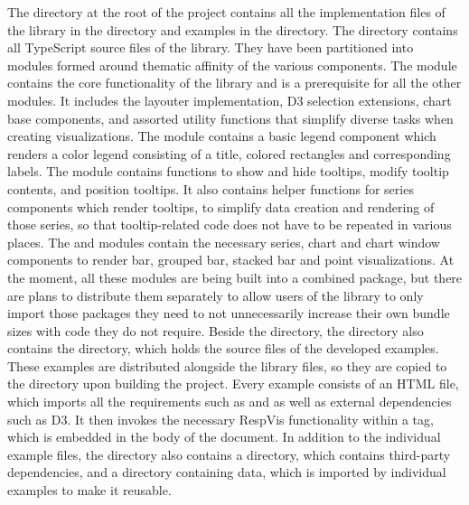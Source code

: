 The  directory at the root of the project contains all the implementation files of the library in the  directory and examples in the  directory.
The  directory contains all TypeScript source files of the library.
They have been partitioned into modules formed around thematic affinity of the various components.
The  module contains the core functionality of the library and is a prerequisite for all the other modules.
It includes the layouter implementation, D3 selection extensions, chart base components, and assorted utility functions that simplify diverse tasks when creating visualizations.
The  module contains a basic legend component which renders a color legend consisting of a title, colored rectangles and corresponding labels.
The  module contains functions to show and hide tooltips, modify tooltip contents, and position tooltips.
It also contains helper functions for series components which render tooltips, to simplify data creation and rendering of those series, so that tooltip-related code does not have to be repeated in various places.
The  and  modules contain the necessary series, chart and chart window components to render bar, grouped bar, stacked bar and point visualizations. 
At the moment, all these modules are being built into a combined package, but there are plans to distribute them separately to allow users of the library to only import those packages they need to not unnecessarily increase their own bundle sizes with code they do not require.
Beside the  directory, the  directory also contains the  directory, which holds the source files of the developed examples.
These examples are distributed alongside the library files, so they are copied to the  directory upon building the project.
Every example consists of an HTML file, which imports all the requirements such as  and  as well as external dependencies such as D3.
It then invokes the necessary RespVis functionality within a  tag, which is embedded in the body of the document.
In addition to the individual example files, the  directory also contains a  directory, which contains third-party dependencies, and a  directory containing data, which is imported by individual examples to make it reusable.

